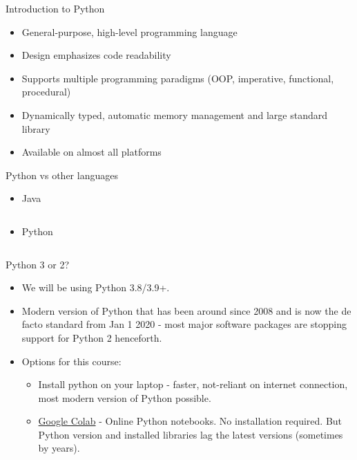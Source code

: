 \documentclass[aspectratio=169]{beamer}
\begin{document}
\begin{frame}{Introduction to Python}
    \begin{itemize}
        \item General-purpose, high-level programming language
        \item Design emphasizes code readability
        \item Supports multiple programming paradigms (OOP, imperative, functional, procedural)
        \item Dynamically typed, automatic memory management and large standard library
        \item Available on almost all platforms
    \end{itemize}
    
\end{frame}


\begin{frame}[fragile]{Python vs other languages}
\begin{itemize}
    \item Java
    \inputminted{java}{example_hello_world_java.java}
    \item Python
    \inputminted{python}{example_hello_world_python.py}
\end{itemize}
\end{frame}

\begin{frame}{Python 3 or 2?}
    \begin{itemize}
        \item We will be using Python 3.8/3.9+.
        \item Modern version of Python that has been around since 2008 and is now the de facto standard from Jan 1 2020 - most major software packages are stopping support for Python 2 henceforth.
        \item Options for this course:
        \begin{itemize}
            \item Install python on your laptop - faster, not-reliant on internet connection, most modern version of Python possible.
            \item \href{https://colab.research.google.com/}{Google Colab} - Online Python notebooks. No installation required. But Python version and installed libraries lag the latest versions (sometimes by years). 
        \end{itemize}
    \end{itemize}
\end{frame} 
\end{document}
